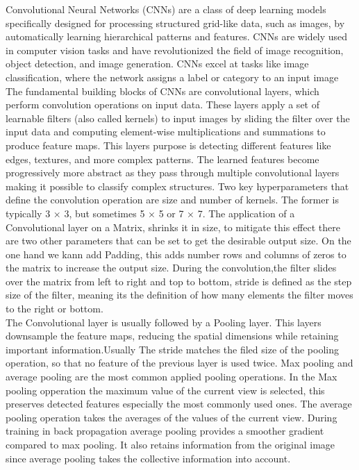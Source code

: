 \documentclass[
a4paper, 
12pt,
grayscalebody, %
abstract=on,
twoside, BCOR10mm, 12pt, DIV13,headinclude, footexclude, final, abstracton, openright
]{ibireprt}
\numberwithin{equation}{chapter}
\numberwithin{table}{chapter}
\numberwithin{figure}{chapter}
\numberwithin{algorithm}{chapter}
\numberwithin{example}{chapter}
\numberwithin{example}{chapter}
\begin{document}
Convolutional Neural Networks (CNNs) are a class of deep learning models specifically designed for processing structured grid-like data, such as images, by automatically learning hierarchical patterns and features. CNNs are widely used in computer vision tasks and have revolutionized the field of image recognition, object detection, and image generation. CNNs excel at tasks like image classification, where the network assigns a label or category to an input image\\
The fundamental building blocks of CNNs are convolutional layers, which perform convolution operations on input data. These layers apply a set of learnable filters (also called kernels) to input images by sliding the filter over the input data and computing element-wise multiplications and summations to produce feature maps. This layers purpose is detecting different features like edges, textures, and more complex patterns. The learned features become progressively more abstract as they pass through multiple convolutional layers making it possible to classify complex structures.	Two key hyperparameters that define the convolution operation are size and number of kernels. The former is typically 3 × 3, but sometimes 5 × 5 or 7 × 7. The application of a Convolutional layer on a Matrix, shrinks it in size, to mitigate this effect there are two other parameters that can be set to get the desirable output size. On the one hand we kann add Padding, this adds number rows and columns of zeros to the matrix to increase the output size. During the convolution,the filter slides over the matrix from left to right and top to bottom, stride is defined as the step size of the filter, meaning its the definition of how many elements the filter moves to the right or bottom.\\
The Convolutional layer is usually followed by a Pooling layer. This  layers downsample the feature maps, reducing the spatial dimensions while retaining important information.Usually The stride matches the filed size of the pooling operation, so that no feature of the previous layer is used twice. Max pooling and average pooling are the most common applied pooling operations. In the Max pooling opperation the maximum value of the current view is selected, this preserves detected features especially the most commonly used ones. The average pooling operation takes the averages of the values of the current view. During training in back propagation average pooling provides a smoother gradient compared to max pooling. It also retains information from the original image since average pooling takes the collective information into account. \\ 
\end{document}
